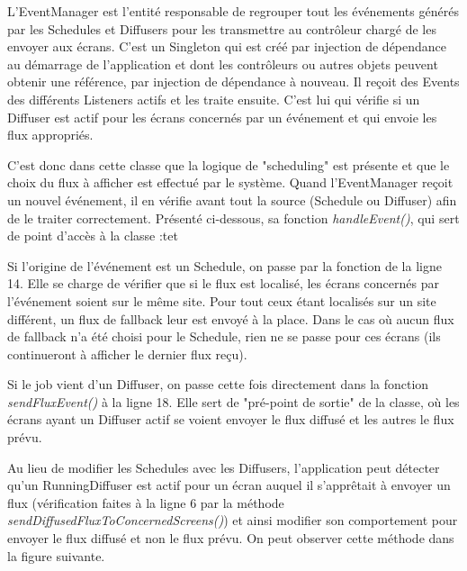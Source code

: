 \documentclass[french]{article}
\begin{document}
L'EventManager est l'entité responsable de regrouper tout les événements générés par les Schedules et Diffusers pour les transmettre au contrôleur chargé de les envoyer aux écrans. C'est un Singleton qui est créé par injection de dépendance au démarrage de l'application et dont les contrôleurs ou autres objets peuvent obtenir une référence, par injection de dépendance à nouveau. Il reçoit des Events des différents Listeners actifs et les traite ensuite. C'est lui qui vérifie si un Diffuser est actif pour les écrans concernés par un événement et qui envoie les flux appropriés.\newline

C'est donc dans cette classe que la logique de "scheduling" est présente et que le choix du flux à afficher est effectué par le système. Quand l'EventManager reçoit un nouvel événement, il en vérifie avant tout la source (Schedule ou Diffuser) afin de le traiter correctement. Présenté ci-dessous, sa fonction \textit{handleEvent()}, qui sert de point d'accès à la classe :tet



Si l'origine de l'événement est un Schedule, on passe par la fonction de la ligne 14. Elle se charge de vérifier que si le flux est localisé, les écrans concernés par l'événement soient sur le même site. Pour tout ceux étant localisés sur un site différent, un flux de fallback leur est envoyé à la place. Dans le cas où aucun flux de fallback n'a été choisi pour le Schedule, rien ne se passe pour ces écrans (ils continueront à afficher le dernier flux reçu).

Si le job vient d'un Diffuser, on passe cette fois directement dans la fonction \textit{sendFluxEvent()} à la ligne 18. Elle sert de "pré-point de sortie" de la classe, où les écrans ayant un Diffuser actif se voient envoyer le flux diffusé et les autres le flux prévu. 



Au lieu de modifier les Schedules avec les Diffusers, l'application peut  détecter qu'un RunningDiffuser est actif pour un écran auquel il s'apprêtait à envoyer un flux (vérification faites à la ligne 6 par la méthode \textit{sendDiffusedFluxToConcernedScreens()}) et ainsi modifier son comportement pour envoyer le flux diffusé et non le flux prévu. On peut observer cette méthode dans la figure suivante.
\end{document}
